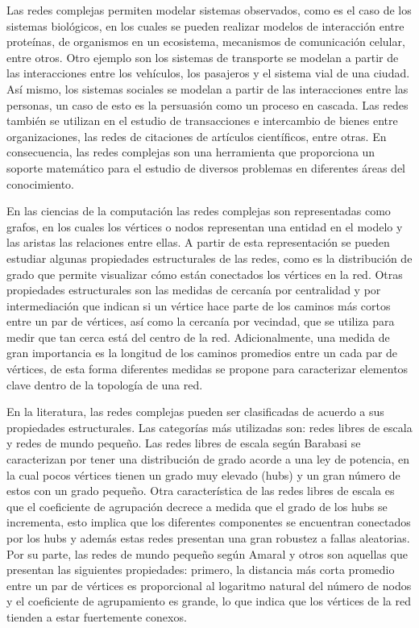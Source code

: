 Las redes complejas permiten modelar sistemas observados, como es el caso de los sistemas biológicos\cite{Costa2008}, en los cuales se pueden realizar modelos de interacción entre proteínas, de organismos en un ecosistema, mecanismos de comunicación celular, entre otros. Otro ejemplo son los sistemas de transporte se modelan a partir de las interacciones entre los vehículos, los pasajeros y el sistema vial de una ciudad\cite{Wu2018}. Así mismo, los sistemas sociales se modelan a partir de las interacciones entre las personas, un caso de esto es la persuasión como un proceso en cascada\cite{Huang2016}. Las redes también se utilizan en el estudio de transacciones e intercambio de bienes entre organizaciones\cite{6676578}, las redes de citaciones de artículos científicos\cite{Zhang2013}, entre otras. En consecuencia, las redes complejas son una herramienta que proporciona un soporte matemático para el estudio de diversos problemas en diferentes áreas del conocimiento.

En las ciencias de la computación las redes complejas\cite{BarabasiNetwork} son representadas como grafos, en los cuales los vértices o nodos representan una entidad en el modelo y las aristas las relaciones entre ellas. A partir de esta representación se pueden estudiar algunas propiedades estructurales de las redes, como es la distribución de grado que permite visualizar cómo están conectados los vértices en la red. Otras propiedades estructurales son las medidas de cercanía por centralidad y por intermediación que indican si un vértice hace parte de los caminos más cortos entre un par de vértices, así como la cercanía por vecindad, que se utiliza para medir que tan cerca está del centro de la red. Adicionalmente, una medida de gran importancia es la longitud de los caminos promedios entre un cada par de vértices, de esta forma diferentes medidas se propone para caracterizar elementos clave dentro de la topología de una red.

En la literatura, las redes complejas pueden ser clasificadas de acuerdo a sus propiedades estructurales. Las categorías más utilizadas son: redes libres de escala y redes de mundo pequeño. Las redes libres de escala según Barabasi\cite{Albert2002} se caracterizan por tener una distribución de grado acorde a una ley de potencia, en la cual pocos vértices tienen un grado muy elevado (hubs) y un gran número de estos con un grado pequeño. Otra característica de las redes libres de escala es que el coeficiente de agrupación decrece a medida que el grado de los hubs se incrementa, esto implica que los diferentes componentes se encuentran conectados por los hubs y además estas redes presentan una gran robustez a fallas aleatorias. Por su parte, las redes de mundo pequeño según Amaral y otros\cite{Amaral2000} son aquellas que presentan las siguientes propiedades: primero, la distancia más corta promedio entre un par de vértices es proporcional al logaritmo natural del número de nodos y el coeficiente de agrupamiento es grande, lo que indica que los vértices de la red tienden a estar fuertemente conexos.

